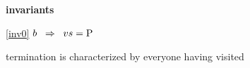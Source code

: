 \textbf{invariants}
\begin{block}
\item[ \eqref{inv0} ]{$b \; \; \Rightarrow \; \; vs = \text{P}$} %
  \item   \begin{block}
    \item    termination is characterized by everyone 
    	having visited 
  \end{block}
\end{block}
